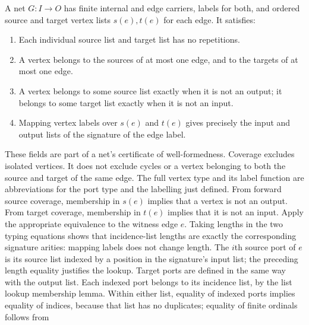 \begin{definition}\label{term:net}
A net $G:\!I\to O$ has finite internal and edge carriers, labels for both, and
ordered source and target vertex lists $s(e),t(e)$ for each edge. It satisfies:
\begin{enumerate}
\item Each individual source list and target list has no repetitions.
\item A vertex belongs to the sources of at most one edge, and to the targets
of at most one edge.
\item A vertex belongs to some source list exactly when it is not an output;
it belongs to some target list exactly when it is not an input.
\item Mapping vertex labels over $s(e)$ and $t(e)$ gives precisely the input
and output lists of the signature of the edge label.
\end{enumerate}
\end{definition}
These fields are part of a net's certificate of well-formedness. Coverage excludes
isolated vertices. It does not exclude cycles or a vertex belonging to both the
source and target of the same edge. The full vertex type and its label function
are abbreviations for the port type and the labelling just defined.
From forward source coverage, membership in $s(e)$ implies that a vertex is not
an output. From target coverage, membership in $t(e)$ implies that it is not an
input. Apply the appropriate equivalence to the witness edge $e$.
Taking lengths in the two typing equations shows that incidence-list lengths are
exactly the corresponding signature arities: mapping labels does not change length.
The $i$th source port of $e$ is its source list indexed by a position in the
signature's input list; the preceding length equality justifies the lookup.
Target ports are defined in the same way with the output list.
Each indexed port belongs to its incidence list, by the list lookup membership
lemma. Within either list, equality of indexed ports implies equality of indices,
because that list has no duplicates; equality of finite ordinals follows from
